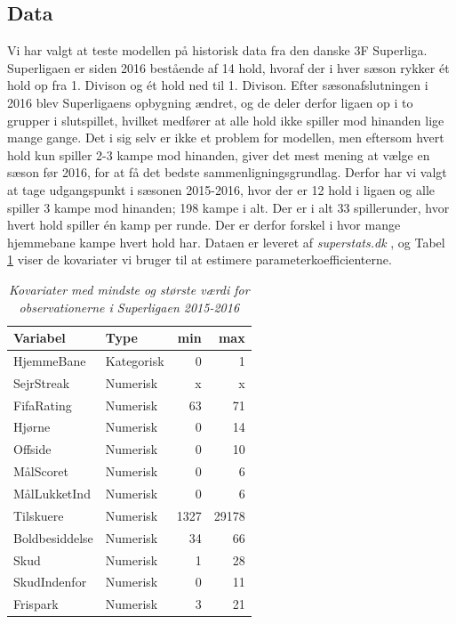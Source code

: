 \documentclass[11pt,a4paper]{article}
\begin{document}
\subsection{Data}
Vi har valgt at teste modellen på historisk data fra den danske 3F Superliga. Superligaen er siden 2016 bestående af 14 hold, hvoraf der i hver sæson rykker ét hold op fra 1. Divison og ét hold ned til 1. Divison. Efter sæsonafslutningen i 2016 blev Superligaens opbygning ændret, og de deler derfor ligaen op i to grupper i slutspillet, hvilket medfører at alle hold ikke spiller mod hinanden lige mange gange. Det i sig selv er ikke et problem for modellen, men eftersom hvert hold kun spiller 2-3 kampe mod hinanden, giver det mest mening at vælge en sæson før 2016, for at få det bedste sammenligningsgrundlag. Derfor har vi valgt at tage udgangspunkt i sæsonen 2015-2016, hvor der er 12 hold i ligaen og alle spiller 3 kampe mod hinanden; 198 kampe i alt. Der er i alt 33 spillerunder, hvor hvert hold spiller én kamp per runde. Der er derfor forskel i hvor mange hjemmebane kampe hvert hold har. Dataen er leveret af \textit{superstats.dk} \cite{Superstats}, og Tabel \ref{tab:Kovariater} viser de kovariater vi bruger til at estimere parameterkoefficienterne.\newline
\begin{table}[t!]
\centering
\begin{adjustbox}{max width=\textwidth}
\begin{tabular}{|l|lrr|}
  \hline
Variabel & Type & min & max \\ 
  \hline
HjemmeBane & Kategorisk & 0 & 1\\
SejrStreak & Numerisk & x & x\\
FifaRating & Numerisk & 63 & 71\\
Hjørne & Numerisk & 0 & 14\\
Offside & Numerisk & 0 & 10\\
MålScoret & Numerisk & 0 & 6\\
MålLukketInd & Numerisk & 0 & 6\\
Tilskuere & Numerisk & 1327 & 29178\\
Boldbesiddelse & Numerisk & 34 & 66\\
Skud & Numerisk & 1 & 28\\
SkudIndenfor & Numerisk & 0 & 11\\
Frispark & Numerisk & 3 & 21 \\
   \hline
\end{tabular}
\end{adjustbox}
\caption{\label{tab:Kovariater}\textit{Kovariater med mindste og største værdi for observationerne i Superligaen 2015-2016}}
\end{table}\\
\end{document}
